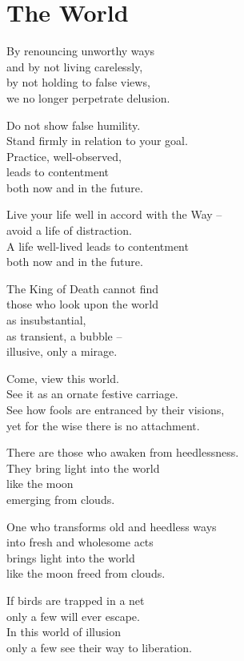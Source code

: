 
\chapter{The World}


By renouncing unworthy ways\\
and by not living carelessly,\\
by not holding to false views,\\
we no longer perpetrate delusion.


Do not show false humility.\\
Stand firmly in relation to your goal.\\
Practice, well-observed,\\
leads to contentment\\
both now and in the future.


Live your life well in accord with the Way --\\
avoid a life of distraction.\\
A life well-lived leads to contentment\\
both now and in the future.


The King of Death cannot find\\
those who look upon the world\\
as insubstantial,\\
as transient, a bubble --\\
illusive, only a mirage.


Come, view this world.\\
See it as an ornate festive carriage.\\
See how fools are entranced by their visions,\\
yet for the wise there is no attachment.


There are those who awaken from heedlessness.\\
They bring light into the world\\
like the moon\\
emerging from clouds.


One who transforms old and heedless ways\\
into fresh and wholesome acts\\
brings light into the world\\
like the moon freed from clouds.


If birds are trapped in a net\\
only a few will ever escape.\\
In this world of illusion\\
only a few see their way to liberation.


